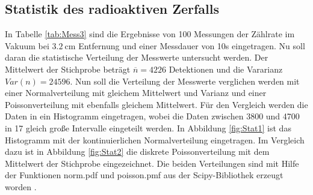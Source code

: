 \subsection{Statistik des radioaktiven Zerfalls}
In Tabelle \ref{tab:Mess3} sind die Ergebnisse von 100 Messungen der Zählrate im Vakuum bei
$\qty{3.2}{\centi\meter}$ Entfernung und einer Messdauer von 10s eingetragen.
Nu soll daran die statistische Verteilung der Messwerte untersucht werden.
Der Mittelwert der Stichprobe beträgt $\overline{n}=4226$ Detektionen und die Vararianz $Var(n)=24596$.
Nun soll die Verteilung der Messwerte verglichen werden mit
einer Normalverteilung mit gleichem Mittelwert und Varianz und einer Poissonverteilung
mit ebenfalls gleichem Mittelwert.
Für den Vergleich werden die Daten in ein Histogramm eingetragen, wobei die Daten zwischen 3800 und
4700 in 17 gleich große Intervalle eingeteilt werden. In Abbildung \ref{fig:Stat1} ist das Histogramm mit der
kontinuierlichen Normalverteilung eingetragen. Im Vergleich dazu ist in Abbildung \ref{fig:Stat2} die diskrete
Poissonverteilung mit dem Mittelwert der Stichprobe eingezeichnet. Die beiden Verteilungen sind mit Hilfe der Funktionen
norm.pdf und poisson.pmf aus der Scipy-Bibliothek erzeugt worden \cite{scipy}. 
